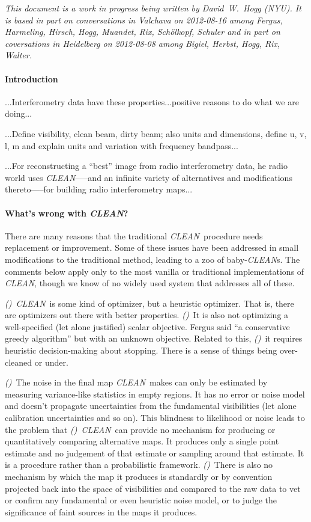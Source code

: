 \documentclass[12pt]{article}
\newcounter{hogg}
\newcommand{\hoggitem}{\textsl{(\thehogg)}\stepcounter{hogg}}
\newcommand{\project}[1]{\textsl{#1}}
\newcommand{\CLEAN}{\project{CLEAN}}
\begin{document}
\textsl{This document is a work in progress being written by
  David~W.~Hogg (NYU).  It is based in part on conversations in
  Valchava on 2012-08-16 among Fergus, Harmeling, Hirsch, Hogg,
  Muandet, Rix, Sch\"olkopf, Schuler and in part on coversations in
  Heidelberg on 2012-08-08 among Bigiel, Herbst, Hogg, Rix, Walter.}

\paragraph{Introduction}

...Interferometry data have these properties...positive reasons to do
what we are doing...

...Define visibility, clean beam, dirty beam; also units and
dimensions, define u, v, l, m and explain units and variation with
frequency bandpass...

...For reconstructing a ``best'' image from radio interferometry data,
he radio world uses \CLEAN--—and an infinite variety of alternatives
and modifications thereto—--for building radio interferometry maps...

\paragraph{What's wrong with \CLEAN?}

There are many reasons that the traditional \CLEAN\ procedure needs
replacement or improvement.  Some of these issues have been addressed
in small modifications to the traditional method, leading to a zoo of
baby-\CLEAN s.  The comments below apply only to the most vanilla or
traditional implementations of \CLEAN, though we know of no widely
used system that addresses all of these.

\hoggitem~\CLEAN\ is some kind of optimizer, but a heuristic
optimizer.  That is, there are optimizers out there with better
properties.  \hoggitem~It is also not optimizing a well-specified (let
alone justified) scalar objective.  Fergus said ``a conservative
greedy algorithm'' but with an unknown objective.  Related to this,
\hoggitem~it requires heuristic decision-making about stopping.  There
is a sense of things being over-cleaned or under.

\hoggitem~The noise in the final map \CLEAN\ makes can only be
estimated by measuring variance-like statistics in empty regions.  It
has no error or noise model and doesn't propagate uncertainties from
the fundamental visibilities (let alone calibration uncertainties and
so on).  This blindness to likelihood or noise leads to the problem
that \hoggitem~\CLEAN\ can provide no mechanism for producing or
quantitatively comparing alternative maps.  It produces only a single
point estimate and no judgement of that estimate or sampling around
that estimate.  It is a procedure rather than a probabilistic
framework.  \hoggitem~There is also no mechanism by which the map it
produces is standardly or by convention projected back into the space
of visibilities and compared to the raw data to vet or confirm any
fundamental or even heuristic noise model, or to judge the
significance of faint sources in the maps it produces.
\end{document}

